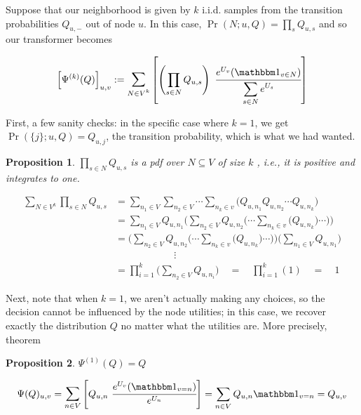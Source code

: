 \documentclass{article}
\newtheorem{prop}{Proposition}
\theoremstyle{definition}
\begin{document}
	Suppose that our neighborhood is given by $k$ i.i.d. samples from the transition probabilities $Q_{u,-}$ out of node $u$. In this case, $\Pr(N;u,Q) = \prod_{s} Q_{u,s}$ and so our transformer becomes
	
	\begin{equation}
		\Big[\Psi^{(k)}(Q)\Big]_{u,v} := \mathlarger{\sum}_{N \in V^{k}} \left[\left(\prod_{s \in N}Q_{u,s}\right) ~\cfrac{ e^{U_v}  (\mathbbm 1_{v \in N})}{ \displaystyle \sum\limits_{ s \in N } e^{U_s} } \right]
	\end{equation}
	
	First, a few sanity checks: in the specific case where $k = 1$, we get $\Pr(\{j\}; u, Q) = Q_{u,j}$, the transition probability, which is what we had wanted.\\
	
	\begin{prop}
		$\prod_{s \in N}Q_{u,s}$ is a pdf over $N \subseteq V$ of size $k$ , i.e., it is positive and integrates to one.
	\end{prop}
	\begin{prf}
		\begin{align*}
			\sum_{N \in V^{k}}\prod_{s \in N}Q_{u,s} &= 
				\sum_{n_1 \in V} \sum_{n_2 \in V}\cdots \sum_{n_k \in v} \Big(Q_{u,n_1}Q_{u,n_2} \cdots Q_{u,n_k}\Big) \\
				&= \sum_{n_1 \in V} Q_{u,n_1} \Big(\sum_{n_2 \in V}Q_{u,n_2} \Big( \cdots \sum_{n_k \in v} \Big(Q_{u,n_k}\Big)\cdots\Big)\Big) \\
				&= \Big(\sum_{n_2 \in V}Q_{u,n_2} \Big( \cdots \sum_{n_k \in v} \Big(Q_{u,n_k}\Big)\cdots\Big)\Big) \Big(\sum_{n_1 \in V} Q_{u,n_1} \Big)\\
				&\hspace{1in}\vdots\\
				&= \prod_{i=1}^k \Big( \sum_{n_2 \in V}Q_{u,n_i} \Big) \quad
				=\quad \prod_{i=1}^k (1) \quad=\quad 1
		\end{align*}
	\end{prf}

	Next, note that when $k=1$, we aren't actually making any choices, so the decision cannot be influenced by the node utilities; in this case, we recover exactly the distribution $Q$ no matter what the utilities are. More precisely,\\
	theorem
	\begin{prop}
		$\Psi^{(1)}(Q) = Q$
	\end{prop}
	\begin{prf}
		\[ \Psi(Q)_{u,v} = \mathlarger{\sum}_{n \in V} \left[Q_{u,n} ~\cfrac{ e^{U_v}  (\mathbbm 1_{v = n})}{ e^{U_n} }\right] = \sum_{n \in V} Q_{u,n} \mathbbm 1_{v=n} = Q_{u,v} 
		 \]
	\end{prf}
\end{document}
